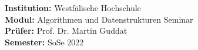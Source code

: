 \begin{titlepage}
    \maketitle
    \vspace{2cm}
    
    \vspace*{\fill}
    \begin{flushleft}
        \Large{\textbf{Institution:} Westf\"alische Hochschule}\\
        \Large{\textbf{Modul:} Algorithmen und Datenstrukturen Seminar} \\
        \Large{\textbf{Pr\"ufer:} Prof. Dr. Martin Guddat}\\
        \Large{\textbf{Semester:} SoSe 2022}
    \end{flushleft}
\end{titlepage}
